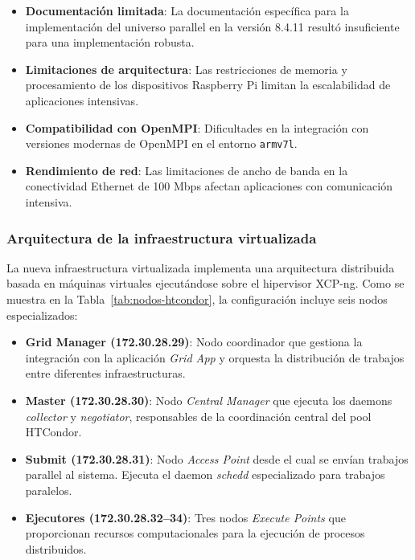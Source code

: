 \begin{itemize}
	\item \textbf{Documentación limitada}: La documentación específica para la implementación del universo parallel en la versión 8.4.11 resultó insuficiente para una implementación robusta.
	
	\item \textbf{Limitaciones de arquitectura}: Las restricciones de memoria y procesamiento de los dispositivos Raspberry Pi limitan la escalabilidad de aplicaciones \MPI intensivas.
	
	\item \textbf{Compatibilidad con OpenMPI}: Dificultades en la integración con versiones modernas de OpenMPI en el entorno \texttt{armv7l}.
	
	\item \textbf{Rendimiento de red}: Las limitaciones de ancho de banda en la conectividad Ethernet de 100 Mbps afectan aplicaciones con comunicación intensiva.
\end{itemize}

\subsubsection{Arquitectura de la infraestructura virtualizada}
\noindent

La nueva infraestructura virtualizada implementa una arquitectura distribuida basada en máquinas virtuales ejecutándose sobre el hipervisor XCP-ng. Como se muestra en la Tabla~\ref{tab:nodos-htcondor}, la configuración incluye seis nodos especializados:

\begin{itemize}
	\item \textbf{Grid Manager (172.30.28.29)}: Nodo coordinador que gestiona la integración con la aplicación \textit{Grid App} y orquesta la distribución de trabajos entre diferentes infraestructuras.
	
	\item \textbf{Master (172.30.28.30)}: Nodo \textit{Central Manager} que ejecuta los daemons \textit{collector} y \textit{negotiator}, responsables de la coordinación central del pool HTCondor.
	
	\item \textbf{Submit (172.30.28.31)}: Nodo \textit{Access Point} desde el cual se envían trabajos parallel al sistema. Ejecuta el daemon \textit{schedd} especializado para trabajos paralelos.
	
	\item \textbf{Ejecutores (172.30.28.32--34)}: Tres nodos \textit{Execute Points} que proporcionan recursos computacionales para la ejecución de procesos \MPI distribuidos.
\end{itemize}

